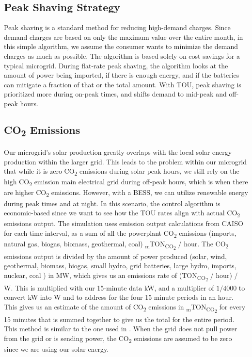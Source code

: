 \documentclass[conference]{IEEEtran}
\begin{document}
    \subsection{Peak Shaving Strategy}
       		Peak shaving is a standard method for reducing high-demand charges. Since demand charges are based on only the maximum value over the entire month, in this simple algorithm, we assume the consumer wants to minimize the demand charges as much as possible. The algorithm is based solely on cost savings for a typical microgrid. During flat-rate peak shaving, the algorithm looks at the amount of power being imported, if there is enough energy, and if the batteries can mitigate a fraction of that or the total amount. With TOU, peak shaving is prioritized more during on-peak times, and shifts demand to mid-peak and off-peak hours. 
    \subsection{CO\textsubscript{2} Emissions}
        	Our microgrid's solar production greatly overlaps with the local solar energy production within the larger grid. This leads to the problem within our microgrid that while it is zero CO\textsubscript{2} emissions during solar peak hours, we still rely on the high CO\textsubscript{2} emission main electrical grid during off-peak hours, which is when there are higher CO\textsubscript{2} emissions. However, with a BESS, we can utilize renewable energy during peak times and at night. In this scenario, the control algorithm is economic-based since we want to see how  the TOU rates align with actual CO\textsubscript{2} emissions output. The simulation uses emission output calculations from CAISO for each time interval, as a sum of all the powerplant CO\textsubscript{2} emissions (imports, natural gas, biogas, biomass, geothermal, coal) \textsubscript{m}TON\textsubscript{CO\textsubscript{2}} / hour. The CO\textsubscript{2} emissions output is divided by the amount of power produced (solar, wind, geothermal, biomass, biogas, small hydro, grid batteries, large hydro, imports, nuclear, coal ) in MW, which gives us an emissions rate of (TON\textsubscript{CO\textsubscript{2}} / hour) / W. This is multiplied with our 15-minute data kW, and a multiplier of  $1/ 4000$ to convert kW into W and to address for the four 15 minute periods in an hour.   This gives us an estimate of the amount of CO\textsubscript{2} emissions in \textsubscript{m}TON\textsubscript{CO\textsubscript{2}} for every 15 minutes that is summed together to give us the total for the entire period.  This method is similar to the one used in \cite{garrido2021dynamic}.  When the grid does not pull power from the grid or is sending power, the CO\textsubscript{2} emissions are assumed to be zero since we are using our solar energy.
\end{document}
